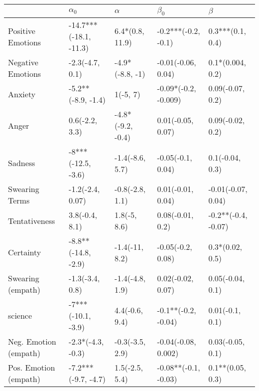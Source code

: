 \begin{tabular}{lllll}
\toprule
{} &              $\alpha_0$ &           $\alpha$ &             $\beta_0$ &              $\beta$ \\
\midrule
Positive Emotions     &  -14.7***(-18.1, -11.3) &    6.4*(0.8, 11.9) &   -0.2***(-0.2, -0.1) &     0.3***(0.1, 0.4) \\
Negative Emotions     &         -2.3(-4.7, 0.1) &    -4.9*(-8.8, -1) &    -0.01(-0.06, 0.04) &     0.1*(0.004, 0.2) \\
Anxiety               &      -5.2**(-8.9, -1.4) &           1(-5, 7) &  -0.09*(-0.2, -0.009) &     0.09(-0.07, 0.2) \\
Anger                 &          0.6(-2.2, 3.3) &  -4.8*(-9.2, -0.4) &     0.01(-0.05, 0.07) &     0.09(-0.02, 0.2) \\
Sadness               &      -8***(-12.5, -3.6) &    -1.4(-8.6, 5.7) &     -0.05(-0.1, 0.04) &      0.1(-0.04, 0.3) \\
Swearing Terms        &        -1.2(-2.4, 0.07) &    -0.8(-2.8, 1.1) &     0.01(-0.01, 0.04) &   -0.01(-0.07, 0.04) \\
Tentativeness         &          3.8(-0.4, 8.1) &       1.8(-5, 8.6) &      0.08(-0.01, 0.2) &  -0.2**(-0.4, -0.07) \\
Certainty             &     -8.8**(-14.8, -2.9) &     -1.4(-11, 8.2) &     -0.05(-0.2, 0.08) &      0.3*(0.02, 0.5) \\
Swearing (empath)     &         -1.3(-3.4, 0.8) &    -1.4(-4.8, 1.9) &     0.02(-0.02, 0.07) &     0.05(-0.04, 0.1) \\
science               &      -7***(-10.1, -3.9) &     4.4(-0.6, 9.4) &   -0.1**(-0.2, -0.04) &      0.01(-0.1, 0.1) \\
Neg. Emotion (empath) &       -2.3*(-4.3, -0.3) &    -0.3(-3.5, 2.9) &   -0.04(-0.08, 0.002) &     0.03(-0.05, 0.1) \\
Pos. Emotion (empath) &     -7.2***(-9.7, -4.7) &     1.5(-2.5, 5.4) &  -0.08**(-0.1, -0.03) &     0.1**(0.05, 0.3) \\
\bottomrule
\end{tabular}
